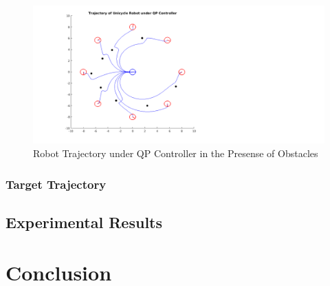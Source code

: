 \documentclass[journal]{IEEEtran}
\begin{document}
\begin{figure}[h!]
\centering
\includegraphics[scale=0.4]{octoPlotProofEditSqur.png} 
\caption{Robot Trajectory under QP Controller in the Presense of Obstacles\label{fig:octoplot}} 
\end{figure}

\subsubsection{Target Trajectory}

\subsection{Experimental Results}
\section{Conclusion}



\end{document}
